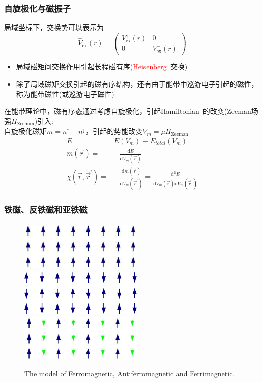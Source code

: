 {\frame
{
	\frametitle{自旋极化与磁振子}
			局域坐标下，交换势可以表示为
			\begin{displaymath}
				\hat{V}_{\mathrm{ex}}(r)=\left(
				\begin{matrix}
					V_{\mathrm{ex}}^+(r) &0\\
					0 &V_{\mathrm{ex}}^-(r)
				\end{matrix}\right)
			\end{displaymath}
	\begin{itemize}
		\item 局域磁矩间交换作用引起长程磁有序(\textcolor{red}{\textrm{Heisenberg~}}交换)
		\item 除了局域磁矩交换引起的磁有序结构，还有由于能带中巡游电子引起的磁性，称为能带磁性(或巡游电子磁性)
	\end{itemize}
	在能带理论中，磁有序态通过考虑自旋极化，引起\textrm{Hamiltonian~}的改变(\textrm{Zeeman}场强$H_{\mathrm{Zeeman}}$)引入:\\
	自旋极化磁矩$m=n^{\uparrow}-n^{\downarrow}$，引起的势能改变$V_m=\mu H_{\mathrm{Zeeman}}$
	\begin{displaymath}
		\begin{aligned}
			E=&E(V_m)\equiv E_{total}(V_m)\\
			m(\vec r)=&-\frac{\mathrm{d}E}{\mathrm{d}V_m(\vec r)}\\
			\chi(\vec r,\vec r^{\prime})=&-\frac{\mathrm{d}m(\vec r)}{\mathrm{d}V_m(\vec r^{\prime})}=\frac{\mathrm{d}^2E}{\mathrm{d}V_m(\vec r)\mathrm{d}V_m(\vec r^{\prime})}
		\end{aligned}
	\end{displaymath}
}

\frame
{
	\frametitle{铁磁、反铁磁和亚铁磁}
\begin{figure}[h!]
	\vspace{-0.20in}
\centering
\includegraphics[height=0.95in,width=2.3in,viewport=0 0 350 230,clip]{Figures/Ferromagnetic.jpeg}\\
\includegraphics[height=0.85in,width=2.3in,viewport=0 -13 350 155,clip]{Figures/Antiferromagnetic.png}\\
\includegraphics[height=0.88in,width=2.3in,viewport=0 0 350 225,clip]{Figures/Ferrimagnetic.jpeg}
\caption{\tiny \textrm{The model of Ferromagnetic, Antiferromagnetic and Ferrimagnetic.}}%
\label{Ferrimagneitic_Model}
\end{figure} 
}

}
